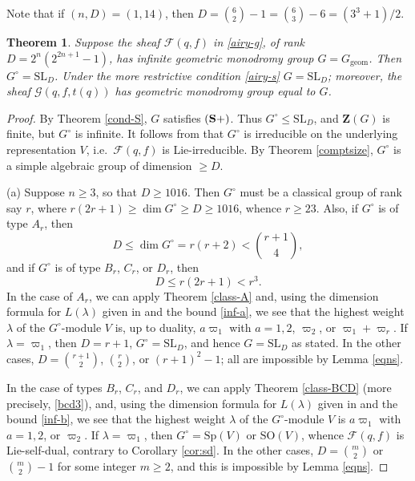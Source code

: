 \documentclass[11pt]{amsart}
\theoremstyle{plain}
\newtheorem{thm}{Theorem}
\theoremstyle{definition}
\numberwithin{thm}{section}
\numberwithin{equation}{thm}
\newcommand{\om}{\varpi}
\newcommand{\SL}{\mathrm{SL}}
\newcommand{\Sp}{\mathrm{Sp}}
\newcommand{\SO}{\mathrm{SO}}
\newcommand{\sF}{{\mathcal F}}
\newcommand{\sG}{{\mathcal G}}
\newcommand{\0}{\emptyset}
\newcommand{\ZB}{{\mathbf Z}}
\newcommand{\geo}{{\mathrm {geom}}}
\newcommand{\CSP}{\mathrm {({\bf S+})}}
\newcommand{\lam}{\lambda}
\begin{document}
Note that if $(n,D) = (1,14)$, then $D = \binom{6}{2}-1 = \binom{6}{3}-6=(3^3+1)/2$.

\begin{thm}\label{inf-m}
Suppose the sheaf $\sF(q,f)$ in \eqref{airy-g}, of rank $D=2^n(2^{2n+1}-1)$, has infinite geometric 
monodromy group $G=G_\geo$. Then $G^\circ=\SL_D$. Under the more restrictive condition \eqref{airy-s} %
$G=\SL_D$; moreover, the sheaf $\sG(q,f,t(q))$ has geometric monodromy group equal to $G$.
\end{thm}

\begin{proof}
By Theorem \ref{cond-S}, $G$ satisfies $\CSP$. 
Thus $G^\circ \leq \SL_D$, and 
$\ZB(G)$ is finite, but $G^\circ$ is infinite. It follows from \cite[Lemma 1.4]{KT5} that $G^\circ$ is irreducible on 
the underlying representation $V$, i.e.\ $\sF(q,f)$ is 
Lie-irreducible. By Theorem \ref{comptsize}, $G^\circ$ is a simple algebraic group of dimension $\geq D$.

\smallskip
(a) Suppose $n \geq 3$, so that $D \geq 1016$. Then $G^\circ$ must be a classical group of rank say $r$, where 
$r(2r+1) \geq \dim G^\circ \geq D \geq 1016$, whence $r \geq 23$. Also, if $G^\circ$ is of type $A_r$, then
\begin{equation}\label{inf-a}
  D \leq \dim G^\circ = r(r+2) < \binom{r+1}{4},
\end{equation}  
and if $G^\circ$ is of type $B_r$, $C_r$, or $D_r$, then 
\begin{equation}\label{inf-b}
  D \leq r(2r+1) < r^3.
\end{equation}  
In the case of $A_r$, we can apply Theorem \ref{class-A} and, using the dimension formula for $L(\lam)$ given in 
\cite[Table 5]{OV} and the bound \eqref{inf-a}, we see that the highest weight $\lam$ of the $G^\circ$-module $V$ is, up to duality, 
$a\om_1$ with $a = 1,2$, $\om_2$, or $\om_1+\om_r$. If $\lam=\om_1$, then $D=r+1$, $G^\circ = \SL_D$,
and hence $G = \SL_D$ as stated. In the other cases, $D = \binom{r+1}{2}$, 
$\binom{r}{2}$, or $(r+1)^2-1$; all are impossible by Lemma \ref{eqns}.

In the case of types $B_r$, $C_r$, and $D_r$, we can apply Theorem \ref{class-BCD} (more precisely, \eqref{bcd3}), and, using the dimension formula for $L(\lam)$ given in \cite[Table 5]{OV} and the bound \eqref{inf-b}, we see that the highest weight $\lam$ of the $G^\circ$-module $V$ is $a\om_1$ with $a = 1,2$, or $\om_2$. If $\lam=\om_1$, then $G^\circ = \Sp(V)$ or $\SO(V)$, whence
$\sF(q,f)$ is Lie-self-dual, contrary to Corollary \ref{cor:sd}.
In the other cases, $D = \binom{m}{2}$ or $\binom{m}{2}-1$ for some integer $m \geq 2$,  
and this is impossible by Lemma \ref{eqns}.


\end{proof}
\end{document}
